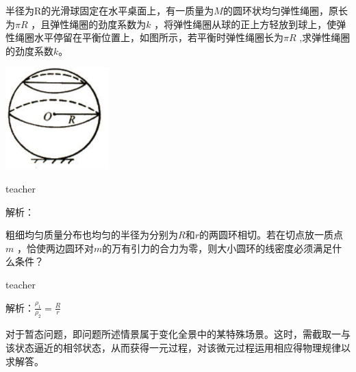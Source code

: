 \begin{example}
	半径为R的光滑球固定在水平桌面上，有一质量为$M$的圆环状均匀弹性绳圈，原长为$\pi R$ ，且弹性绳圈的劲度系数为$k$ ，将弹性绳圈从球的正上方轻放到球上，使弹性绳圈水平停留在平衡位置上，如图所示，若平衡时弹性绳圈长为$\pi R$ ,求弹性绳圈的劲度系数$k$。
\begin{flushright}
\includegraphics[width = 0.3\textwidth]{images/smallAna-2.pdf} 
\end{flushright}
\begin{taggedblock}{teacher}

解析：
\end{taggedblock}
\end{example}

\begin{example}
	粗细均匀质量分布也均匀的半径为分别为$R$和$r$的两圆环相切。若在切点放一质点$m$ ，恰使两边圆环对$m$的万有引力的合力为零，则大小圆环的线密度必须满足什么条件？
\begin{taggedblock}{teacher}

解析：$\frac{\rho_1}{\rho_2}=\frac{R}{r}$
\end{taggedblock}
\end{example}


	对于暂态问题，即问题所述情景属于变化全景中的某特殊场景。这时，需截取一与该状态逼近的相邻状态，从而获得一元过程，对该微元过程运用相应得物理规律以求解答。

